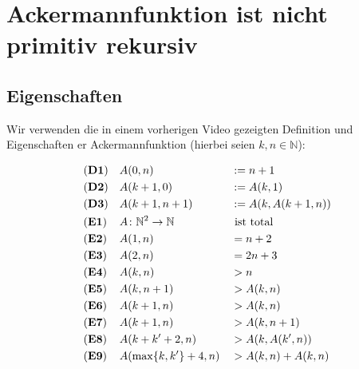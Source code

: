 \documentclass[a4paper]{amsart}
\theoremstyle{definition}
\newcommand{\N}{\ensuremath{\mathbb{ N }}}
\begin{document}
\section{Ackermannfunktion ist nicht primitiv rekursiv}

\subsection{Eigenschaften}
Wir verwenden die in einem vorherigen Video gezeigten Definition und Eigenschaften er Ackermannfunktion
(hierbei seien $k, n \in \N$):

\begin{align*}
    &\text{(\textbf{D1})} && A( 0, n )                   &&:= n+1\\
    &\text{(\textbf{D2})} && A( k+1, 0 )                 &&:= A( k, 1 )\\
    &\text{(\textbf{D3})} && A( k+1, n+1 )               &&:= A( k, A(k+1, n) )\\
    &\text{(\textbf{E1})} && A \colon \N^2 \to \N        &&\text{ ist total}\\
    &\text{(\textbf{E2})} && A( 1, n )                   &&= n+2\\
    &\text{(\textbf{E3})} && A( 2, n )                   &&= 2n+3\\
    &\text{(\textbf{E4})} && A( k, n )                   &&> n\\
    &\text{(\textbf{E5})} && A( k, n+1 )                 &&> A( k, n )\\
    &\text{(\textbf{E6})} && A( k+1, n )                 &&> A( k, n )\\
    &\text{(\textbf{E7})} && A( k+1, n )                 &&> A( k, n+1 )\\
    &\text{(\textbf{E8})} && A( k+k'+2, n )              &&> A( k, A( k',n) )\\
    &\text{(\textbf{E9})} && A( \max \{k, k' \} + 4, n ) &&> A( k, n ) + A( k, n )
\end{align*}
\end{document}
